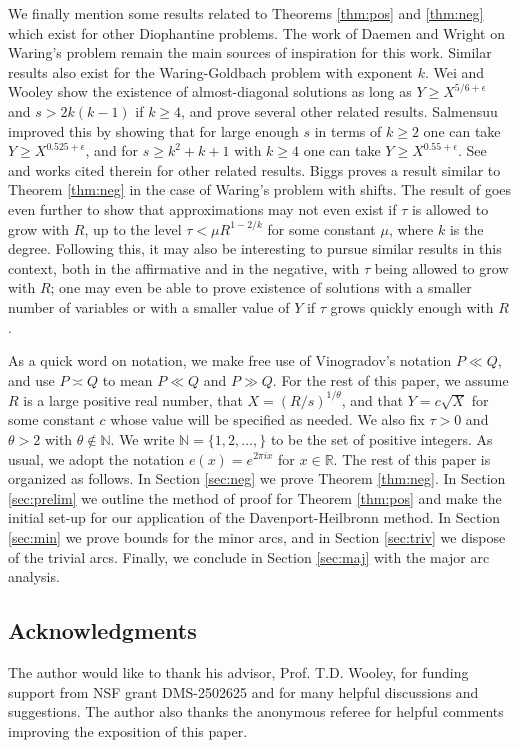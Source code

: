 \documentclass[11pt,reqno]{amsart}
\numberwithin{equation}{section}
\begin{document}
We finally mention some results related to Theorems \ref{thm:pos} and \ref{thm:neg} which exist for other Diophantine problems. The work of Daemen \cite{DaemenAA1} and Wright \cite{Wright1} on Waring's problem remain the main sources of inspiration for this work. Similar results also exist for the Waring-Goldbach problem with exponent $k$. Wei and Wooley \cite{WW} show the existence of almost-diagonal solutions as long as $Y \geq X^{5/6+\epsilon}$ and $s > 2k(k-1)$ if $k \geq 4$, and prove several other related results. Salmensuu \cite{Sal} improved this by showing that for large enough $s$ in terms of $k \geq 2$ one can take $Y \geq X^{0.525+\epsilon}$, and for $s \geq k^2+k+1$ with $k \geq 4$ one can take $Y \geq X^{0.55+\epsilon}$. See \cite{Sal} and works cited therein for other related results. Biggs \cite{Biggs} proves a result similar to Theorem \ref{thm:neg} in the case of Waring's problem with shifts. The result of \cite{Biggs} goes even further to show that approximations may not even exist if $\tau$ is allowed to grow with $R$, up to the level $\tau < \mu R^{1-2/k}$ for some constant $\mu$, where $k$ is the degree. Following this, it may also be interesting to pursue similar results in this context, both in the affirmative and in the negative, with $\tau$ being allowed to grow with $R$; one may even be able to prove existence of solutions with a smaller number of variables or with a smaller value of $Y$ if $\tau$ grows quickly enough with $R$. 

As a quick word on notation, we make free use of Vinogradov's notation $P \ll Q$, and use $P \asymp Q$ to mean $P \ll Q$ and $P \gg Q$. For the rest of this paper, we assume $R$ is a large positive real number, that $X = (R/s)^{1/\theta}$, and that $Y = c\sqrt{X}$ for some constant $c$ whose value will be specified as needed. We also fix $\tau > 0$ and $\theta > 2$ with $\theta \notin \mathbb{N}$. We write $\mathbb{N} = \{1,2,\ldots,\}$ to be the set of positive integers. As usual, we adopt the notation $e(x) = e^{2\pi i x}$ for $x \in \mathbb{R}$. 
The rest of this paper is organized as follows. In Section \ref{sec:neg} we prove Theorem \ref{thm:neg}. In Section \ref{sec:prelim} we outline the method of proof for Theorem \ref{thm:pos} and make the initial set-up for our application of the Davenport-Heilbronn method. In Section \ref{sec:min} we prove bounds for the minor arcs, and in Section \ref{sec:triv} we dispose of the trivial arcs. Finally, we conclude in Section \ref{sec:maj} with the major arc analysis.

\subsection{Acknowledgments} The author would like to thank his advisor, Prof. T.D. Wooley, for funding support from NSF grant DMS-2502625 and for many helpful discussions and suggestions. The author also thanks the anonymous referee for helpful comments improving the exposition of this paper. 
\end{document}
